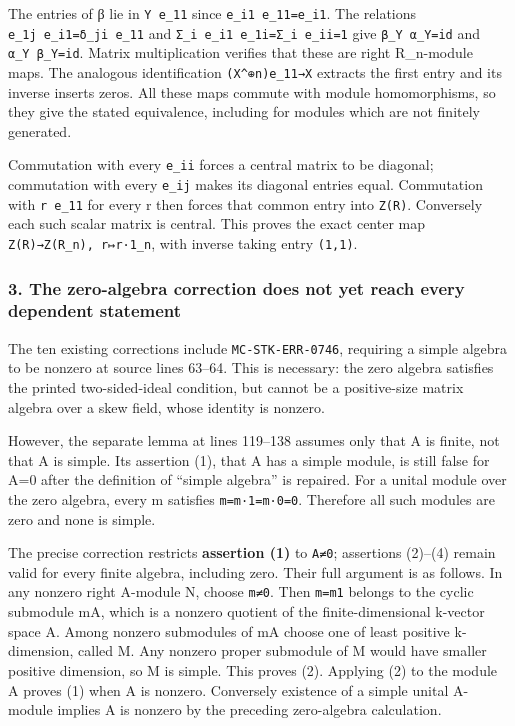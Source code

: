 The entries of β lie in \texttt{Y\ e\_11} since \texttt{e\_i1\ e\_11=e\_i1}. The relations \texttt{e\_1j\ e\_i1=δ\_ji\ e\_11} and \texttt{Σ\_i\ e\_i1\ e\_1i=Σ\_i\ e\_ii=1} give \texttt{β\_Y\ α\_Y=id} and \texttt{α\_Y\ β\_Y=id}. Matrix multiplication verifies that these are right R\_n-module maps. The analogous identification \texttt{(X\^{}⊕n)e\_11→X} extracts the first entry and its inverse inserts zeros. All these maps commute with module homomorphisms, so they give the stated equivalence, including for modules which are not finitely generated.

Commutation with every \texttt{e\_ii} forces a central matrix to be diagonal; commutation with every \texttt{e\_ij} makes its diagonal entries equal. Commutation with \texttt{r\ e\_11} for every r then forces that common entry into \texttt{Z(R)}. Conversely each such scalar matrix is central. This proves the exact center map \texttt{Z(R)→Z(R\_n),\ r↦r·1\_n}, with inverse taking entry \texttt{(1,1)}.

\subsubsection{3. The zero-algebra correction does not yet reach every dependent statement}\label{the-zero-algebra-correction-does-not-yet-reach-every-dependent-statement}

The ten existing corrections include \texttt{MC-STK-ERR-0746}, requiring a simple algebra to be nonzero at source lines 63--64. This is necessary: the zero algebra satisfies the printed two-sided-ideal condition, but cannot be a positive-size matrix algebra over a skew field, whose identity is nonzero.

However, the separate lemma at lines 119--138 assumes only that A is finite, not that A is simple. Its assertion (1), that A has a simple module, is still false for A=0 after the definition of ``simple algebra'' is repaired. For a unital module over the zero algebra, every m satisfies \texttt{m=m·1=m·0=0}. Therefore all such modules are zero and none is simple.

The precise correction restricts \textbf{assertion (1)} to \texttt{A≠0}; assertions (2)--(4) remain valid for every finite algebra, including zero. Their full argument is as follows. In any nonzero right A-module N, choose \texttt{m≠0}. Then \texttt{m=m1} belongs to the cyclic submodule mA, which is a nonzero quotient of the finite-dimensional k-vector space A. Among nonzero submodules of mA choose one of least positive k-dimension, called M. Any nonzero proper submodule of M would have smaller positive dimension, so M is simple. This proves (2). Applying (2) to the module A proves (1) when A is nonzero. Conversely existence of a simple unital A-module implies A is nonzero by the preceding zero-algebra calculation.

